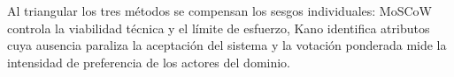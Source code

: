 Al triangular los tres m\'etodos se compensan los sesgos individuales: MoSCoW controla la viabilidad t\'ecnica y el l\'imite de esfuerzo, Kano identifica atributos cuya ausencia paraliza la aceptaci\'on del sistema y la votaci\'on ponderada mide la intensidad de preferencia de los actores del dominio.
